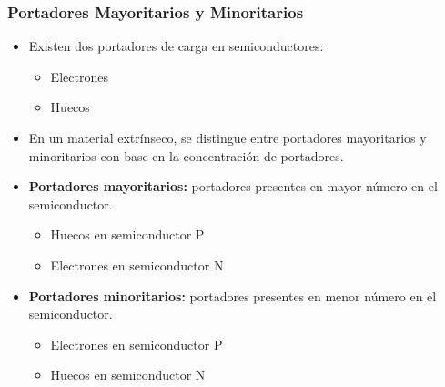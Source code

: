 \documentclass[10pt,t,aspectratio=169]{beamer}
\begin{document}
\begin{frame}[t]
  \frametitle{Portadores Mayoritarios y Minoritarios}

  \begin{itemize}
    \item Existen dos portadores de carga en semiconductores:
    \begin{itemize}
      \item Electrones
      \item Huecos
    \end{itemize}
    \vspace{3mm}
    \item En un material extrínseco, se distingue entre portadores mayoritarios y minoritarios con base en la concentración de portadores.
    \vspace{3mm}
    \item \textbf{Portadores mayoritarios:} portadores presentes en mayor número en el semiconductor.
    \begin{itemize}
      \item Huecos en semiconductor P
      \item Electrones en semiconductor N
    \end{itemize}
    \vspace{3mm}
    \item \textbf{Portadores minoritarios:} portadores presentes en menor número en el semiconductor.
    \begin{itemize}
      \item Electrones en semiconductor P
      \item Huecos en semiconductor N
    \end{itemize}
  \end{itemize}
\end{frame}
\end{document}
